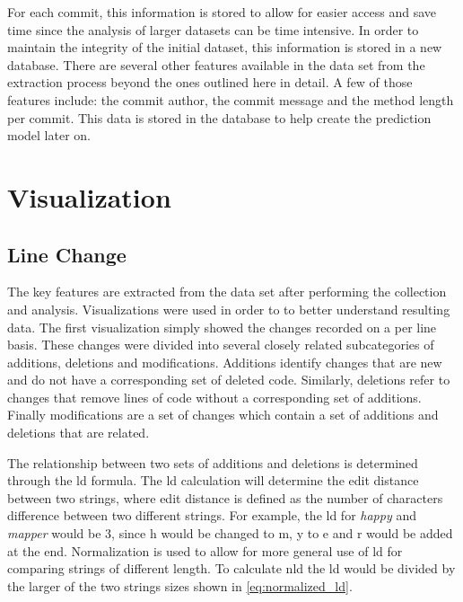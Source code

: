 For each commit, this information is stored to allow for easier access and save time since the analysis of larger datasets can be time intensive. In order to maintain the integrity of the initial dataset, this information is stored in a new database. There are several other features available in the data set from the extraction process beyond the ones outlined here in detail. A few of those features include: the commit author, the commit message and the method length per commit. This data is stored in the database to help create the prediction model later on.

\section{Visualization}

\subsection{Line Change}
\label{subsec:line_change}

The key features are extracted from the data set after performing the collection and analysis. Visualizations were used in order to to better understand resulting data. The first visualization simply showed the changes recorded on a per line basis. These changes were divided into several closely related subcategories of additions, deletions and modifications. Additions identify changes that are new and do not have a corresponding set of deleted code. Similarly, deletions refer to changes that remove lines of code without a corresponding set of additions. Finally modifications are a set of changes which contain a set of additions and deletions that are related.



% 


The relationship between two sets of additions and deletions is determined through the \gls{ld} formula. The \gls{ld} calculation will determine the edit distance between two strings, where edit distance is defined as the number of characters difference between two different strings. For example, the \gls{ld} for \textit{happy} and \textit{mapper} would be 3, since h would be changed to m, y to e and r would be added at the end. Normalization is used to allow for more general use of \gls{ld} for comparing strings of different length. To calculate \gls{nld} the \gls{ld} would be divided by the larger of the two strings sizes shown in \autoref{eq:normalized_ld}.

